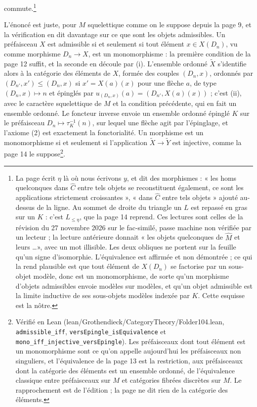 \documentclass[11pt,a4paper]{article}
\begin{document}

commute.\footnote{La page écrit $\eta$ là où nous écrivons $y$, et dit des
morphismes : « les homs quelconques dans $\widehat{C}$ entre tels objets se
reconstituent également, ce sont les applications strictement croissantes »,
« dans $\widehat{C}$ entre tels objets » ajouté au-dessus de la ligne. Au
sommet de droite du triangle un $L$ est repassé en gras sur un $K$ : c'est
$L_{\leq \eta}$, que la page 14 reprend. Ces lectures sont celles de la
révision du 27 novembre 2026 sur le fac-similé, passe machine non vérifiée
par un lecteur ; la lecture antérieure donnait « les objets quelconques de
$\widehat{M}$ et leurs \ldots », avec un mot illisible. Les deux
obliques ne portent sur la feuille qu'un signe d'isomorphie. L'équivalence est
affirmée et non démontrée ; ce qui la rend plausible est que tout élément de
$X(D_{n})$ se factorise par un sous-objet modèle, donc est un monomorphisme, de
sorte qu'un morphisme d'objets admissibles envoie modèles sur modèles, et
qu'un objet admissible est la limite inductive de ses sous-objets modèles
indexée par $K$. Cette esquisse est la nôtre.}

L'énoncé est juste, pour $M$ squelettique comme on le suppose depuis la
page 9, et la vérification en dit davantage sur ce que sont les objets
admissibles. Un préfaisceau $X$ est admissible si et seulement si tout élément
$x \in X(D_n)$, vu comme morphisme $D_n \to X$, est un monomorphisme : la
première condition de la page 12 suffit, et la seconde en découle par (i).
L'ensemble ordonné $\widetilde{X}$ s'identifie alors à la catégorie des
éléments de $X$, formée des couples $(D_n, x)$, ordonnés par
$(D_{n'}, x') \leq (D_n, x)$ si $x' = X(a)(x)$ pour une flèche $a$, de type
$(D_n, x) \mapsto n$ et épinglés par $u_{(D_n, x)}(a) = (D_{n'}, X(a)(x))$ ;
c'est (ii), avec le caractère squelettique de $M$ et la condition précédente,
qui en fait un ensemble ordonné. Le foncteur inverse envoie un ensemble ordonné
épinglé $K$ sur le préfaisceau $D_n \mapsto \tau_K^{-1}(n)$, sur lequel une
flèche agit par l'épinglage, et l'axiome (2) est exactement la fonctorialité.
Un morphisme est un monomorphisme si et seulement si l'application
$\widetilde{X} \to \widetilde{Y}$ est injective, comme la page 14 le
suppose\footnote{Vérifié en Lean (lean/Grothendieck/CategoryTheory/Folder104.lean,
\texttt{admissible\_iff}, \texttt{versEpingle\_isEquivalence} et
\texttt{mono\_iff\_injective\_versEpingle}). Les préfaisceaux dont tout élément
est un monomorphisme sont ce qu'on appelle aujourd'hui les préfaisceaux non
singuliers, et l'équivalence de la page 13 est la restriction, aux préfaisceaux
dont la catégorie des éléments est un ensemble ordonné, de l'équivalence
classique entre préfaisceaux sur $M$ et catégories fibrées discrètes sur $M$.
Le rapprochement est de l'édition ; la page ne dit rien de la catégorie des
éléments.}.
\end{document}
